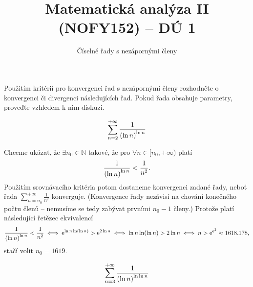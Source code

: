 \documentclass[answers]{exam}
\title{\vspace{-3ex}Matematická analýza II (NOFY152) – DÚ 1}
\author{Číselné řady s nezápornými členy}
\date{\vspace{-5ex}}
\let\originalleft\left
\let\originalright\right
\renewcommand{\left}{\mathopen{}\mathclose\bgroup\originalleft}
\renewcommand{\right}{\aftergroup\egroup\originalright}
\begin{document}
\maketitle

Použitím kritérií pro konvergenci řad s nezápornými členy rozhodněte o konvergenci či divergenci následujících řad. Pokud řada obsahuje parametry, proveďte vzhledem k nim diskuzi.

\begin{questions}
  \question
  \begin{equation*}
    \sum_{n = 2}^{+\infty}
    \frac{1}{\left( \ln n \right)^{\ln n}}
  \end{equation*}
  
  \begin{solution}
  	Chceme ukázat, že $\exists n_0 \in \mathbb{N}$ takové, že pro $\forall n \in [n_0, +\infty)$ platí
  	\begin{equation*}
  		\frac{1}{\left( \ln n \right)^{\ln n}}
  		<
  		\frac{1}{n^2}.	
  	\end{equation*}
  	Použitím srovnávacího kritéria potom dostaneme konvergenci zadané řady, neboť řada $\sum_{n = n_0}^{+\infty} \frac{1}{n^2}$ konverguje. (Konvergence řady nezávisí na chování konečného počtu členů -- nemusíme se tedy zabývat prvními $n_0 -1$ členy.) Protože platí následující řetězec ekvivalencí
  	\begin{equation*}
  		\frac{1}{\left( \ln n \right)^{\ln n}}
  		<
  		\frac{1}{n^2}
  		\iff
  		\mathrm{e}^{\ln n \ln \left( \ln n \right)}
  		>
  		\mathrm{e}^{2 \ln n}
  		\iff
  		\ln n \ln \left( \ln n \right)
  		>
  		2 \ln n
  		\iff  
  		n 
  		> 
  		\mathrm{e}^{\mathrm{e}^2} \approx 1618.178,			
  	\end{equation*}
  	stačí volit $n_0 = 1619$.
  \end{solution}

  \question
  \begin{equation*}
    \sum_{n = 3}^{+\infty}
    \frac{1}{\left( \ln n \right)^{\ln \ln n}}
  \end{equation*}
  

\end{questions}
\end{document}
